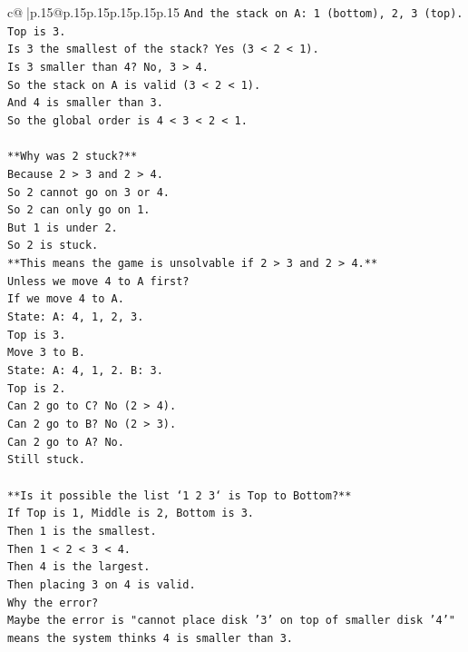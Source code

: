 \documentclass{article}
\begin{document}
{\begin{supertabular}{c@{$\;$}|p{.15\linewidth}@{}p{.15\linewidth}p{.15\linewidth}p{.15\linewidth}p{.15\linewidth}p{.15\linewidth}}
{{{\texttt{And the stack on A: 1 (bottom), 2, 3 (top).} \\
\texttt{Top is 3.} \\
\texttt{Is 3 the smallest of the stack? Yes (3 < 2 < 1).} \\
\texttt{Is 3 smaller than 4? No, 3 > 4.} \\
\texttt{So the stack on A is valid (3 < 2 < 1).} \\
\texttt{And 4 is smaller than 3.} \\
\texttt{So the global order is 4 < 3 < 2 < 1.} \\
\\ 
\texttt{**Why was 2 stuck?**} \\
\texttt{Because 2 > 3 and 2 > 4.} \\
\texttt{So 2 cannot go on 3 or 4.} \\
\texttt{So 2 can only go on 1.} \\
\texttt{But 1 is under 2.} \\
\texttt{So 2 is stuck.} \\
\texttt{**This means the game is unsolvable if 2 > 3 and 2 > 4.**} \\
\texttt{Unless we move 4 to A first?} \\
\texttt{If we move 4 to A.} \\
\texttt{State: A: 4, 1, 2, 3.} \\
\texttt{Top is 3.} \\
\texttt{Move 3 to B.} \\
\texttt{State: A: 4, 1, 2. B: 3.} \\
\texttt{Top is 2.} \\
\texttt{Can 2 go to C? No (2 > 4).} \\
\texttt{Can 2 go to B? No (2 > 3).} \\
\texttt{Can 2 go to A? No.} \\
\texttt{Still stuck.} \\
\\ 
\texttt{**Is it possible the list `1 2 3` is Top to Bottom?**} \\
\texttt{If Top is 1, Middle is 2, Bottom is 3.} \\
\texttt{Then 1 is the smallest.} \\
\texttt{Then 1 < 2 < 3 < 4.} \\
\texttt{Then 4 is the largest.} \\
\texttt{Then placing 3 on 4 is valid.} \\
\texttt{Why the error?} \\
\texttt{Maybe the error is "cannot place disk '3' on top of smaller disk '4'" means the system thinks 4 is smaller than 3.} \\
}}}
\end{supertabular}}
\end{document}
